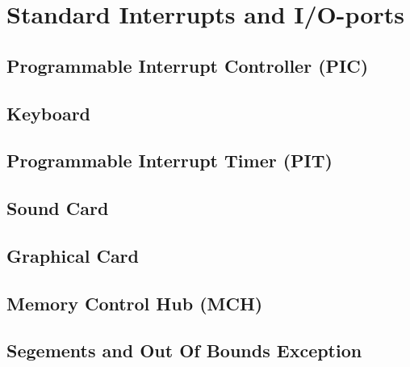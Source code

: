 \documentclass[twoside,a4paper]{memoir}
\begin{document}
\chapter{Standard Interrupts and I/O-ports}
\section{Programmable Interrupt Controller (PIC)}
\section{Keyboard}
\section{Programmable Interrupt Timer (PIT)}
\section{Sound Card}
\section{Graphical Card}
\section{Memory Control Hub (MCH)}
\section{Segements and Out Of Bounds Exception}
\end{document}
